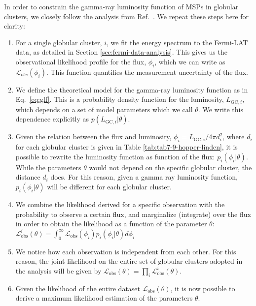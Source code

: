 In order to constrain the gamma-ray luminosity function of MSPs in globular clusters, we closely follow the analysis from Ref.~\cite{Hooper:2016rap}. 
We repeat these steps here for clarity:
\begin{enumerate}
    \item For a single globular cluster, $i$, we fit the energy spectrum to the Fermi-LAT data, as detailed in Section \ref{sec:fermi-data-analysis}. This gives us the observational likelihood profile for the flux, $\phi_i$, which we can write as $\mathcal{L}_{obs}(\phi_i)$. This function quantifies the measurement uncertainty of the flux.
    \item  We define the theoretical model for the gamma-ray luminosity function as in Eq.~\ref{eq:glf}. This is a probability density function  for the luminosity, $L_{\textrm{GC}, i}$, which depends on a set of model parameters which we call $\theta$.  We write this dependence explicitly as $p(L_{\textrm{GC}, i}|\theta)$.
    \item Given the relation between the flux and luminosity, $\phi_i = L_{\textrm{GC},i}/4\pi d_i^2$, where $d_i$ for each globular cluster is given in Table \ref{tab:tab7-9-hopper-linden}, it is possible to rewrite the luminosity function as function of the flux: $p_i(\phi_i|\theta)$. While the parameters $\theta$ would not depend on the specific globular cluster, the distance $d_i$ does. For this reason, given a gamma ray luminosity function, $p_i(\phi_i|\theta)$ will be different for each globular cluster.
    \item We combine the likelihood derived for a specific observation with the probability to observe a certain flux, and marginalize (integrate) over the flux in order to obtain the likelihood as a function of the parameter $\theta$: $\mathcal{L}_\textrm{obs}^i(\theta)=\int_0^\infty \mathcal{L}_\textrm{obs}(\phi_i)p_i(\phi_i|\theta)d\phi_i$
    \item We notice how each observation is independent from each other. For this reason, the joint likelihood on the entire set of globular clusters adopted in the analysis will be given by $\mathcal{L}_\textrm{obs}(\theta)=\prod_i \mathcal{L}_\textrm{obs}^i(\theta)$.
    \item Given the likelihood of the entire dataset $\mathcal{L}_\textrm{obs}(\theta)$, it is now possible to derive a maximum likelihood estimation of the parameters $\theta$.
\end{enumerate}



